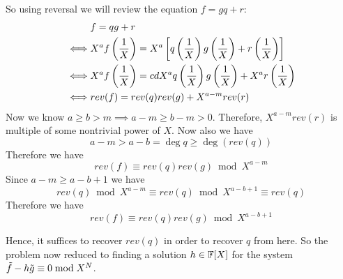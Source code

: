 
So using reversal we will review the equation $f=gq+r$:
\begin{align*}
	& f=qg+r\\
	\iff & X^af\left(\frac1X\right)=X^a\left[q\left(\frac1X\right)g\left(\frac1X\right)+r\left(\frac1X\right)\right]\\
	\iff & X^af\left(\frac1X\right)=cdX^aq\left(\frac1X\right)g\left(\frac1X\right)+X^ar\left(\frac1X\right)\\
	\iff & rev(f)=rev(q)rev(g)+X^{a-m}rev(r) 
\end{align*}
Now we know $a\geq b>m\implies a-m\geq b-m>0$. Therefore, $X^{a-m}rev(r)$ is multiple of some nontrivial power of $X$. Now also we have $$a-m>a-b=\deg q\geq \deg(rev(q))$$ Therefore we have $$rev(f)\equiv rev(q)rev(g)\bmod {X^{a-m}}$$Since $a-m\geq a-b+1$ we have $$rev(q)\bmod {X^{a-m}}\equiv rev(q)\bmod {X^{a-b+1}}\equiv rev(q)$$Therefore we have $$rev(f)\equiv rev(q)rev(g)\bmod {X^{a-b+1}}$$

Hence, it suffices to recover $rev(q)$ in order to recover $q$ from here. So the problem now reduced to finding a solution $h\in\mathbb{F}[X]$ for the system $\tilde{f}-h\tilde{g}\equiv 0\bmod{X^N}$.

